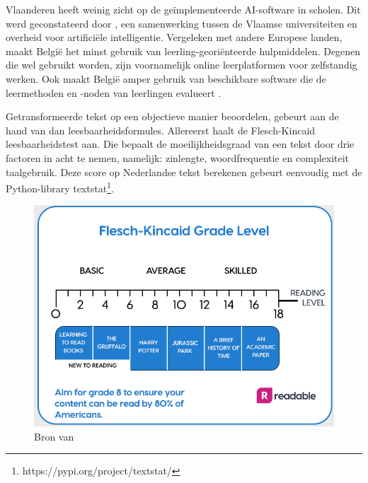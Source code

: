Vlaanderen heeft weinig zicht op de geïmplementeerde AI-software in scholen. Dit werd geconstateerd door \autocite{Martens2021}, een samenwerking tussen de Vlaamse universiteiten en overheid voor artificiële intelligentie. Vergeleken met andere Europese landen, maakt België het minst gebruik van leerling-georiënteerde hulpmiddelen. Degenen die wel gebruikt worden, zijn voornamelijk online leerplatformen voor zelfstandig werken. Ook maakt België amper gebruik van beschikbare software die de leermethoden en -noden van leerlingen evalueert \autocite{Martens2021a}. 


Getransformeerde tekst op een objectieve manier beoordelen, gebeurt aan de hand van dan leesbaarheidsformules. Allereerst haalt \textcite{Readable2021} de Flesch-Kincaid leesbaarheidstest aan. Die bepaalt de moeilijkheidsgraad van een tekst door drie factoren in acht te nemen, namelijk: zinlengte, woordfrequentie en complexiteit taalgebruik. Deze score op Nederlandse tekst berekenen gebeurt eenvoudig met de Python-library textstat\footnote{https://pypi.org/project/textstat/}. 


\begin{figure}
	\includegraphics[width=\linewidth]{img/Screenshot_302.png}
	\caption{Bron van \textcite{Readable2021}}
\end{figure}



